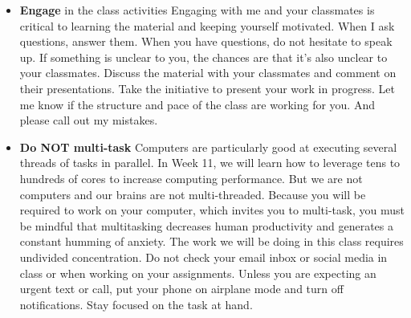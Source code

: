 \documentclass[11pt]{article}
\begin{document}
\begin{itemize}
	\item \textbf{Engage} in the class activities 
	\subitem Engaging with me and your classmates is critical to learning the material and keeping yourself motivated.   When I ask questions, answer them. When you have questions, do not hesitate to speak up. If something is unclear to you, the chances are that it's also unclear to your classmates. Discuss the material with your classmates and comment on their presentations. Take the initiative to present your work in progress. Let me know if the structure and pace of the class are working for you. And please call out my mistakes.
	
		\item \textbf{Do NOT multi-task}
		\subitem Computers are particularly good at executing several threads
        of tasks in parallel. In Week 11,  we will learn how to leverage tens
        to hundreds of cores to increase computing performance.    But we are
        not computers and our brains are not multi-threaded.  Because you will
        be required to work on your computer, which invites you to multi-task, you must be mindful that multitasking decreases human productivity and generates a constant humming of anxiety. The work we will be doing in this class requires undivided concentration. Do not check your email inbox or social media in class or when working on your assignments. Unless you are expecting an urgent text or call, put your phone on airplane mode and turn off notifications.  Stay focused on the task at hand.
        

\end{itemize}
\end{document}
